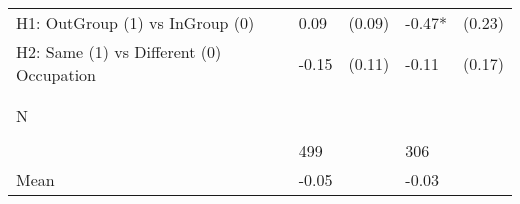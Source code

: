 \begin{tabular}{l*{4}{l}}
H1: OutGroup (1) vs InGroup (0)&     0.09   &   (0.09)&    -0.47*  &   (0.23)\\
 
H2: Same (1) vs Different (0) Occupation&    -0.15   &   (0.11)&    -0.11   &   (0.17)\\
 
  \\\\[-0.5cm] N \\\\[-0.6cm]&      499   &         &      306   &         \\
Mean            &    -0.05&         &    -0.03&         \\
 
\bottomrule  \end{tabular}  
